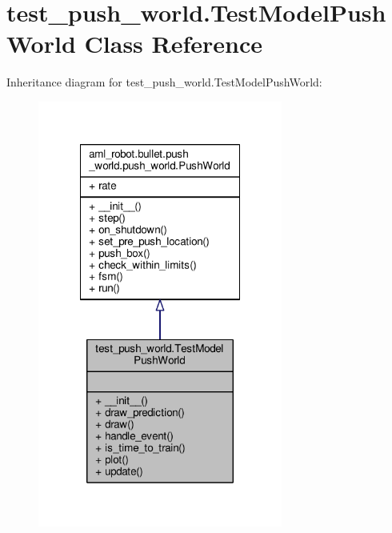 \hypertarget{classtest__push__world_1_1_test_model_push_world}{\section{test\-\_\-push\-\_\-world.\-Test\-Model\-Push\-World Class Reference}
\label{classtest__push__world_1_1_test_model_push_world}
}


Inheritance diagram for test\-\_\-push\-\_\-world.\-Test\-Model\-Push\-World\-:\nopagebreak
\begin{figure}[H]
\begin{center}
\leavevmode
\includegraphics[width=228pt]{classtest__push__world_1_1_test_model_push_world__inherit__graph}
\end{center}
\end{figure}


